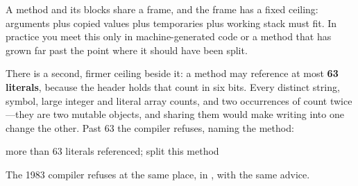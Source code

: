 A method and its blocks share a frame, and the frame has a fixed ceiling:
arguments plus copied values plus temporaries plus working stack must fit. In
practice you meet this only in machine-generated code or a method that has
grown far past the point where it should have been split.

There is a second, firmer ceiling beside it: a method may reference at most
\textbf{63 literals}, because the header holds that count in six bits. Every
distinct string, symbol, large integer and literal array counts, and two
occurrences of  count twice---they are two mutable objects, and
sharing them would make writing into one change the other. Past 63 the
compiler refuses, naming the method:

\begin{plain}
more than 63 literals referenced; split this method
\end{plain}

The 1983 compiler refuses at the same place, in , with
the same advice.
